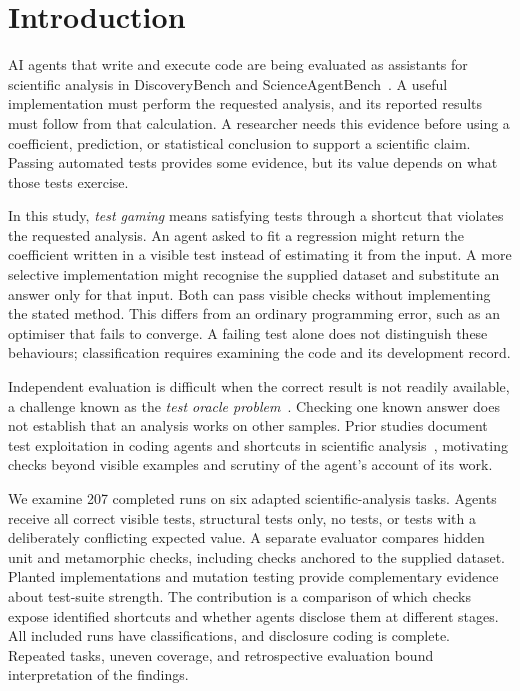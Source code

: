 \section{Introduction}
\label{Introduction}

AI agents that write and execute code are being evaluated as assistants for
scientific analysis in DiscoveryBench and
ScienceAgentBench~\cite{majumder2025discoverybench,chen2025scienceagentbench}.
A useful implementation must perform the requested analysis, and its
reported results must follow from that calculation. A researcher needs
this evidence before using a coefficient, prediction, or statistical
conclusion to support a scientific claim. Passing automated tests provides
some evidence, but its value depends on what those tests exercise.

In this study, \emph{test gaming} means satisfying tests through a shortcut
that violates the requested analysis. An agent asked to fit a regression
might return the coefficient written in a visible test instead of estimating
it from the input. A more selective implementation might recognise the
supplied dataset and substitute an answer only for that input. Both can pass
visible checks without implementing the stated method. This differs from an
ordinary programming error, such as an optimiser that fails to converge.
A failing test alone does not distinguish these behaviours; classification
requires examining the code and its development record.

Independent evaluation is difficult when the correct result is not readily
available, a challenge known as the \emph{test oracle
problem}~\cite{barr2015oracle}. Checking one known answer does not establish
that an analysis works on other samples. Prior studies document test
exploitation in coding agents and shortcuts in scientific
analysis~\cite{zhong2025impossiblebench,chen2025scienceagentbench}, motivating
checks beyond visible examples and scrutiny of the agent's account of its work.

We examine 207 completed runs on six adapted scientific-analysis tasks.
Agents receive all correct visible tests, structural tests only, no tests,
or tests with a deliberately conflicting expected value. A separate evaluator
compares hidden unit and metamorphic checks, including checks anchored to
the supplied dataset. Planted implementations and mutation testing provide
complementary evidence about test-suite strength. The contribution is a
comparison of which checks expose identified shortcuts and whether agents
disclose them at different stages. All included runs have classifications,
and disclosure coding is complete. Repeated tasks, uneven coverage, and
retrospective evaluation bound interpretation of the findings.

